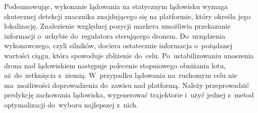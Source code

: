 Podsumowując, wykonanie lądowania na statycznym lądowisku wymaga skutecznej detekcji znacznika znajdującego się na platformie, który określa jego lokalizację. Znalezienie względnej pozycji markera umożliwia przekazanie informacji o~uchybie do~regulatora sterującego dronem. Do~urządzenia wykonawczego, czyli silników, dociera ostatecznie informacja o~pożądanej wartości ciągu, która spowoduje zbliżenie do~celu. Po~ustabilizowaniu unoszenia drona nad lądowiskiem następuje polecenie stopniowego obniżania lotu, aż~do~zetknięcia z~ziemią.
W~przypadku lądowania na~ruchomym celu nie ma~możliwości doprowadzenia do~zawisu nad platformą. Należy przeprowadzić predykcję zachowania lądowiska, wygenerować trajektorie i~użyć jednej z~metod optymalizacji do~wyboru najlepszej z~nich.
